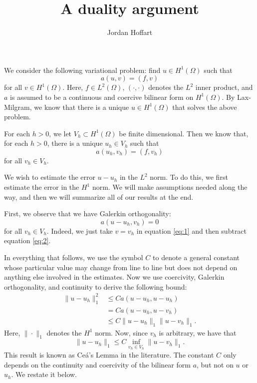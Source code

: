 \documentclass{article}
\title{A duality argument}
\author{Jordan Hoffart}
\date{}
\theoremstyle{plain}
\begin{document}
\maketitle

We consider the following variational problem: find $u \in H^1(\Omega)$ such that
\begin{equation}\label{eq:1}
	a(u,v) = (f,v)
\end{equation}
for all $v \in H^1(\Omega)$.
Here, $f \in L^2(\Omega)$, $(\cdot,\cdot)$ denotes the $L^2$ inner product, and $a$ is assumed to be a continuous and coercive bilinear form on $H^1(\Omega)$.
By Lax-Milgram, we know that there is a unique $u \in H^1(\Omega)$ that solves the above problem.

For each $h > 0$, we let $V_h \subset H^1(\Omega)$ be finite dimensional.
Then we know that, for each $h > 0$, there is a unique $u_h \in V_h$ such that
\begin{equation}\label{eq:2}
	a(u_h, v_h) = (f,v_h)
\end{equation}
for all $v_h \in V_h$.

We wish to estimate the error $u-u_h$ in the $L^2$ norm.
To do this, we first estimate the error in the $H^1$ norm.
We will make assumptions needed along the way, and then we will summarize all of our results at the end.

First, we observe that we have Galerkin orthogonality:
\begin{equation}\label{eq:3}
	a(u-u_h,v_h) = 0
\end{equation}
for all $v_h \in V_h$.
Indeed, we just take $v = v_h$ in equation \eqref{eq:1} and then subtract equation \eqref{eq:2}.

In everything that follows, we use the symbol $C$ to denote a general constant whose particular value may change from line to line but does not depend on anything else involved in the estimates.
Now we use coercivity, Galerkin orthogonality, and continuity to derive the following bound:
\begin{align*}
	\|u-u_h\|_1^2 & \leq Ca(u-u_h,u-u_h)          \\
	              & = Ca(u-u_h,u-v_h)             \\
	              & \leq C\|u-u_h\|_1\|u-v_h\|_1.
\end{align*}
Here, $\|\cdot\|_1$ denotes the $H^1$ norm.
Now, since $v_h$ is arbitrary, we have that
\begin{equation}\label{eq:4}
	\|u-u_h\|_1 \leq C\inf_{v_h\in V_h}\|u-v_h\|_1.
\end{equation}
This result is known as Ce\'a's Lemma in the literature.
The constant $C$ only depends on the continuity and coercivity of the bilinear form $a$, but not on $u$ or $u_h$.
We restate it below.
\end{document}
